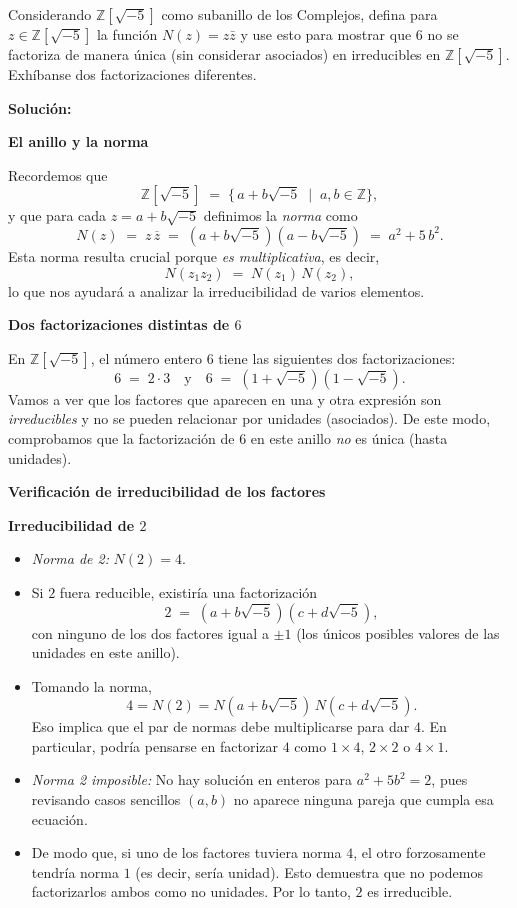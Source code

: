 Considerando $\mathbb{Z}[\sqrt{-5}]$ como subanillo de los Complejos, defina para $z \in \mathbb{Z}[\sqrt{-5}]$ la función $N(z) = z\bar{z}$ y use esto para mostrar que $6$ no se factoriza de manera única (sin considerar asociados) en irreducibles en $\mathbb{Z}[\sqrt{-5}]$. Exhíbanse dos factorizaciones diferentes.

\noindent
\textbf{Solución:}

\medskip

\noindent
\textbf{El anillo y la norma}

\noindent
Recordemos que
\[
\mathbb{Z}[\sqrt{-5}] \;=\; \{\, a + b\sqrt{-5} \;\mid\; a,b\in\mathbb{Z}\},
\]
y que para cada \(z = a + b\sqrt{-5}\) definimos la \emph{norma} como
\[
N(z) \;=\; z \, \overline{z} 
\;=\; (a + b\sqrt{-5})(a - b\sqrt{-5})
\;=\; a^2 + 5\,b^2.
\]
Esta norma resulta crucial porque \emph{es multiplicativa}, es decir, 
\[
N(z_1 z_2) \;=\; N(z_1)\,N(z_2),
\]
lo que nos ayudará a analizar la irreducibilidad de varios elementos.

\bigskip

\noindent
\textbf{Dos factorizaciones distintas de \(6\)}

\noindent
En \(\mathbb{Z}[\sqrt{-5}]\), el número entero \(6\) tiene las siguientes dos factorizaciones:
\[
6 \;=\; 2 \cdot 3
\quad\text{y}\quad
6 \;=\; (1 + \sqrt{-5})(1 - \sqrt{-5}).
\]
Vamos a ver que los factores que aparecen en una y otra expresión son \emph{irreducibles} y no se pueden relacionar por unidades (asociados). De este modo, comprobamos que la factorización de \(6\) en este anillo \emph{no} es única (hasta unidades).

\bigskip

\noindent
\textbf{Verificación de irreducibilidad de los factores}

\medskip

\noindent
\textbf{Irreducibilidad de \(2\)}

\begin{itemize}
    \item \emph{Norma de 2:} \(N(2) = 4\).
    \item Si \(2\) fuera reducible, existiría una factorización 
    \[
    2 \;=\; (a + b\sqrt{-5})(c + d\sqrt{-5}),
    \]
    con ninguno de los dos factores igual a \(\pm 1\) (los únicos posibles valores de las unidades en este anillo).  
    \item Tomando la norma, 
    \[
    4 = N(2) = N(a + b\sqrt{-5})\, N(c + d\sqrt{-5}).
    \]
    Eso implica que el par de normas debe multiplicarse para dar \(4\). En particular, podría pensarse en factorizar \(4\) como \(1 \times 4\), \(2 \times 2\) o \(4 \times 1\).
    \item \emph{Norma 2 imposible:} No hay solución en enteros para \(a^2 + 5 b^2 = 2\), pues revisando casos sencillos \((a,b)\) no aparece ninguna pareja que cumpla esa ecuación.  
    \item De modo que, si uno de los factores tuviera norma \(4\), el otro forzosamente tendría norma \(1\) (es decir, sería unidad). Esto demuestra que no podemos factorizarlos ambos como no unidades. Por lo tanto, \(2\) es irreducible.
\end{itemize}

